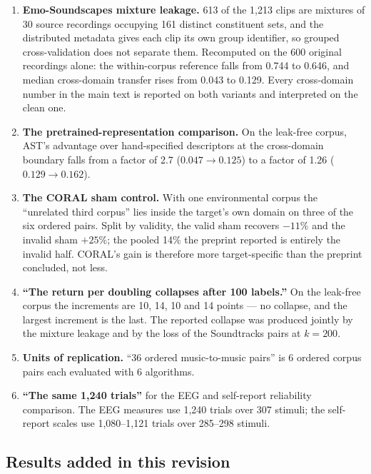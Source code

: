 \begin{enumerate}
\item \textbf{Emo-Soundscapes mixture leakage.} 613 of the 1,213 clips are
mixtures of 30 source recordings occupying 161 distinct constituent sets, and
the distributed metadata gives each clip its own group identifier, so grouped
cross-validation does not separate them. Recomputed on the 600 original
recordings alone: the within-corpus reference falls from 0.744 to 0.646, and
median cross-domain transfer rises from 0.043 to 0.129. Every cross-domain
number in the main text is reported on both variants and interpreted on the
clean one.

\item \textbf{The pretrained-representation comparison.} On the leak-free
corpus, AST's advantage over hand-specified descriptors at the cross-domain
boundary falls from a factor of 2.7 ($0.047 \rightarrow 0.125$) to a factor of
1.26 ($0.129 \rightarrow 0.162$).

\item \textbf{The CORAL sham control.} With one environmental corpus the
``unrelated third corpus'' lies inside the target's own domain on three of the
six ordered pairs. Split by validity, the valid sham recovers $-11\%$ and the
invalid sham $+25\%$; the pooled 14\% the preprint reported is entirely the
invalid half. CORAL's gain is therefore more target-specific than the preprint
concluded, not less.

\item \textbf{``The return per doubling collapses after 100 labels.''} On the
leak-free corpus the increments are 10, 14, 10 and 14 points --- no collapse,
and the largest increment is the last. The reported collapse was produced
jointly by the mixture leakage and by the loss of the Soundtracks pairs at
$k = 200$.

\item \textbf{Units of replication.} ``36 ordered music-to-music pairs'' is 6
ordered corpus pairs each evaluated with 6 algorithms.

\item \textbf{``The same 1,240 trials''} for the EEG and self-report
reliability comparison. The EEG measures use 1,240 trials over 307 stimuli;
the self-report scales use 1,080--1,121 trials over 285--298 stimuli.
\end{enumerate}

\subsection*{Results added in this revision}

